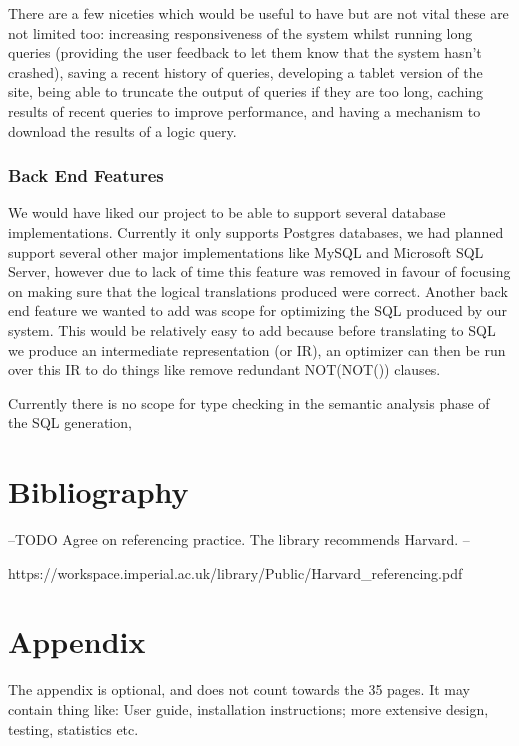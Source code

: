 \documentclass[a4paper, 11pt]{article}
\begin{document}
    There are a few niceties which would be useful to have but are not vital
    these are not limited too: increasing responsiveness of the system whilst 
    running long queries (providing the user feedback to let them know that the
    system hasn't crashed), saving a recent history of queries, developing a 
    tablet version of the site, being able to truncate the output of queries if 
    they are too long, caching results of recent queries to improve performance,
    and having a mechanism to download the results of a logic query.  

    
    \subsubsection{Back End Features} 
    We would have liked our project to be able to support several database
    implementations. Currently it only supports Postgres databases, we had
    planned support several other major implementations like MySQL and
    Microsoft SQL Server, however due to lack of time this feature was removed
    in favour of focusing on making sure that the logical translations produced
    were correct. Another back end feature we wanted to add was scope for
    optimizing the SQL produced by our system. This would be relatively easy to
    add because before translating to SQL we produce an intermediate
    representation (or IR), an optimizer can then be run over this IR to do
    things like remove redundant NOT(NOT()) clauses.
   
    Currently there is no scope for type checking in the semantic analysis phase
    of the SQL generation,

   
    

\section{Bibliography}
  \printbibliography

  --TODO Agree on referencing practice. The library recommends Harvard. --

  https://workspace.imperial.ac.uk/library/Public/Harvard\_referencing.pdf

\appendix
\section{Appendix}
  The appendix is optional, and does not count towards the 35 pages. It may
  contain thing like: User guide, installation instructions; more extensive
  design, testing, statistics etc.
\end{document}
